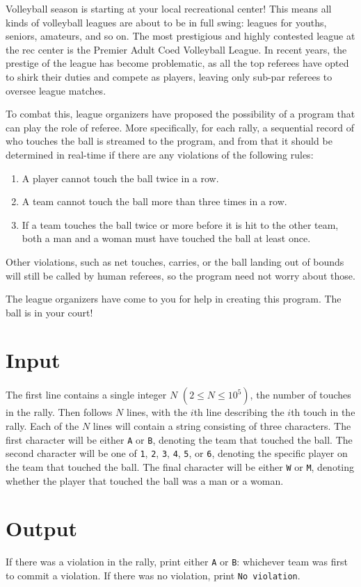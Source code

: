 
Volleyball season is starting at your local recreational center! This means all kinds of volleyball
leagues are about to be in full swing: leagues for youths, seniors, amateurs, and so on. The most
prestigious and highly contested league at the rec center is the Premier Adult Coed Volleyball
League. In recent years, the prestige of the league has become problematic, as all the top referees
have opted to shirk their duties and compete as players, leaving only sub-par referees to oversee
league matches.

To combat this, league organizers have proposed the possibility of a program that can play the role of
referee. More specifically, for each rally, a sequential record of who touches the ball is streamed to
the program, and from that it should be determined in real-time if there are any violations of the
following rules:

\begin{enumerate}
    \item A player cannot touch the ball twice in a row.
    \item A team cannot touch the ball more than three times in a row.
    \item If a team touches the ball twice or more before it is hit to the other team, both a man
    and a woman must have touched the ball at least once.
\end{enumerate}

Other violations, such as net touches, carries, or the ball landing out of bounds will still be called
by human referees, so the program need not worry about those.

The league organizers have come to you for help in creating this program. The ball is in your court!

\section*{Input}

The first line contains a single integer $N$ $(2 \leq N \leq 10^5)$, the number of touches in the rally. 
Then follows $N$ lines, with the $i$th line describing the $i$th touch in the rally. Each of the $N$ lines
will contain a string consisting of three characters. The first character will be either \texttt{A} or
\texttt{B}, denoting the team that touched the ball. The second character will be one of \texttt{1},
\texttt{2}, \texttt{3}, \texttt{4}, \texttt{5}, or \texttt{6}, denoting the specific player on the team that
touched the ball. The final character will be either \texttt{W} or \texttt{M}, denoting whether the player
that touched the ball was a man or a woman.

\section*{Output}

If there was a violation in the rally, print either \texttt{A} or \texttt{B}: whichever team was first to
commit a violation. If there was no violation, print \texttt{No violation}.
